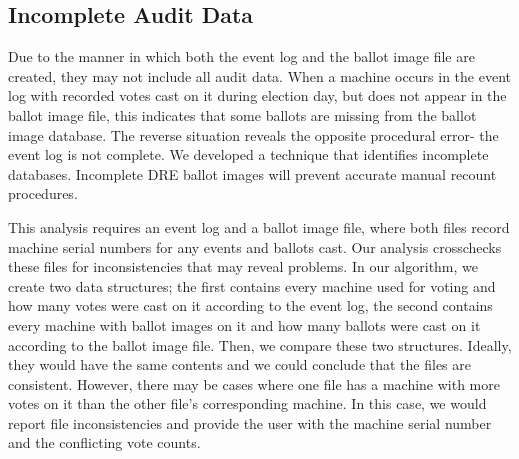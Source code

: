 \subsection{Incomplete Audit Data}
Due to the manner in which both the event log and the ballot image file are created, they may not include all audit data. When a machine occurs in the event log with recorded votes cast on it during election day, but does not appear in the ballot image file, this indicates that some ballots are missing from the ballot image database.  The reverse situation reveals the opposite procedural error- the event log is not complete.  We developed a technique that identifies incomplete databases.  Incomplete DRE ballot images will prevent accurate manual recount procedures.

This analysis requires an event log and a ballot image file, where both files record machine serial numbers for any events and ballots cast.  Our analysis crosschecks these files for inconsistencies that may reveal problems.  In our algorithm, we create two data structures; the first contains every machine used for voting and how many votes were cast on it according to the event log, the second contains every machine with ballot images on it and how many ballots were cast on it according to the ballot image file.  Then, we compare these two structures.  Ideally, they would have the same contents and we could conclude that the files are consistent.  However, there may be cases where one file has a machine with more votes on it than the other file's corresponding machine.  In this case, we would report file inconsistencies and provide the user with the machine serial number and the conflicting vote counts.

